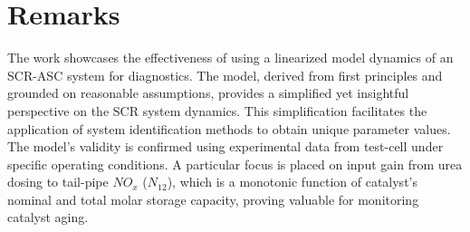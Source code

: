 \section{Remarks}
The work showcases the effectiveness of using a linearized model dynamics of
an SCR-ASC system for diagnostics. The model, derived from first principles and
grounded on reasonable assumptions, provides a simplified yet insightful
perspective on the SCR system dynamics. This simplification facilitates the
application of system identification methods to obtain unique parameter values.
The model's validity is confirmed using experimental data from test-cell under
specific operating conditions. A particular focus is placed on input gain from
urea dosing to tail-pipe $NO_x$ ($N_{12}$), which is a monotonic function of
catalyst's nominal and total molar storage capacity, proving valuable for
monitoring catalyst aging.
